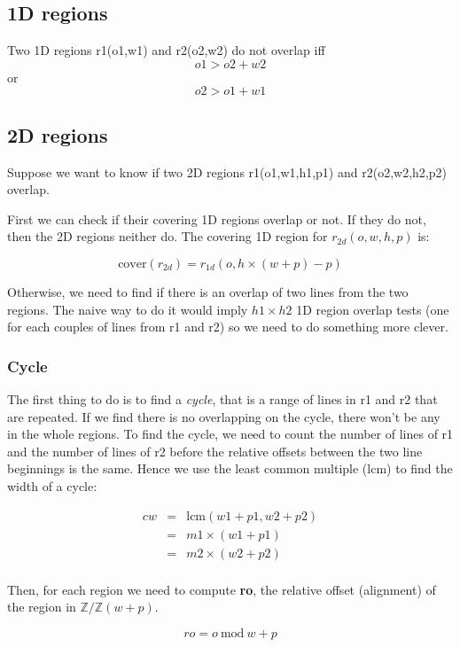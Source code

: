 \documentclass[twocolumn]{article}
\begin{document}
\subsection{1D regions}

Two 1D regions r1(o1,w1) and r2(o2,w2) do not overlap iff 
\[ o1 > o2+w2 \] or \[o2 > o1 + w1 \]

\subsection{2D regions}

Suppose we want to know if two 2D regions r1(o1,w1,h1,p1) and r2(o2,w2,h2,p2)
overlap.

First we can check if their covering 1D regions overlap or not. If they do not,
then the 2D regions neither do. The covering 1D region for $r_{2d}(o,w,h,p)$ is:

\[ \textrm{cover}(r_{2d}) = r_{1d}(o, h \times (w + p) - p) \]

Otherwise, we need to find if there is an overlap of two lines from the two
regions. The naive way to do it would imply $h1 \times h2$ 1D region overlap
tests (one for each couples of lines from r1 and r2) so we need to do something
more clever.

\subsubsection{Cycle}

The first thing to do is to find a \emph{cycle}, that is a range of lines in r1
and r2 that are repeated. If we find there is no overlapping on the cycle, there
won't be any in the whole regions. To find the cycle, we need to count the number
of lines of r1 and the number of lines of r2 before the relative offsets between
the two line beginnings is the same. Hence we use the least common multiple
(lcm) to find the width of a cycle:

\[
\begin{array}{rcl}
cw &=& \textrm{lcm} (w1+p1,w2+p2) \\
   &=& m1 \times (w1 + p1) \\ 
   &=& m2 \times (w2 + p2) \\
\end{array}
\]

Then, for each region we need to compute \textbf{ro}, the relative offset
(alignment) of the region in $\mathbb{Z}/\mathbb{Z}(w+p)$.

\[ ro  = o\ \textrm{mod}\ w + p \]
\end{document}
